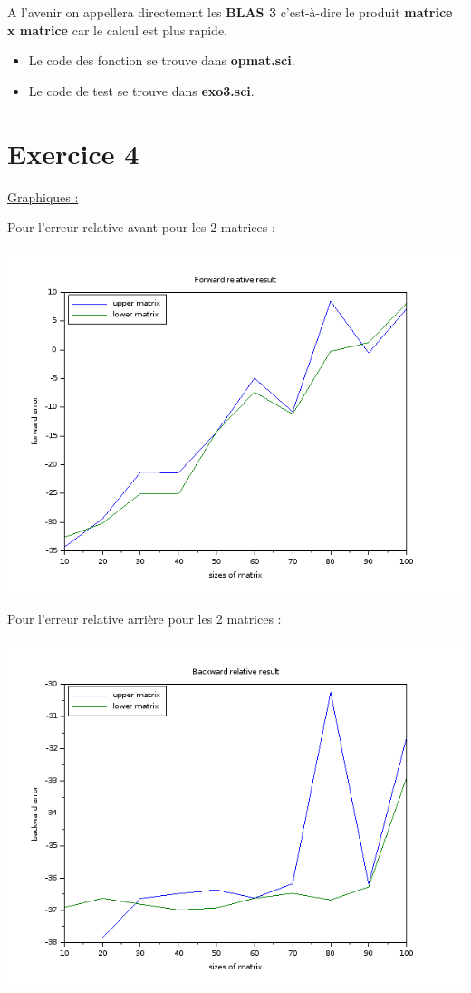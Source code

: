 \documentclass{article}
\begin{document}
A l'avenir on appellera directement les \textbf{BLAS 3} c'est-à-dire
le produit \textbf{matrice x matrice} car le calcul est plus rapide.

\begin{itemize}
\item Le code des fonction se trouve dans \textbf{opmat.sci}.
\item Le code de test se trouve dans \textbf{exo3.sci}.
\end{itemize}

\section*{Exercice 4}

\underline{Graphiques :} \newline

Pour l'erreur relative avant pour les 2 matrices :

\includegraphics[scale=0.5]{img/ferrorb.png}

Pour l'erreur relative arrière pour les 2 matrices :

\includegraphics[scale=0.5]{img/berrorb.png}
\end{document}
